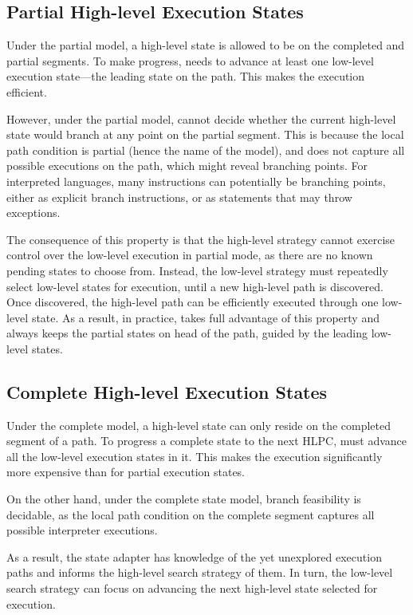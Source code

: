\subsection{Partial High-level Execution States}

Under the partial model, a high-level state is allowed to be on the completed and partial segments.
%
To make progress, \chef needs to advance at least one low-level execution state---the leading state on the path.  This makes the execution efficient.

However, under the partial model, \chef cannot decide whether the current high-level state would branch at any point on the partial segment.
%
This is because the local path condition is partial (hence the name of the model), and does not capture all possible executions on the path, which might reveal branching points.  For interpreted languages, many instructions can potentially be branching points, either as explicit branch instructions, or as statements that may throw exceptions.  

The consequence of this property is that the high-level strategy cannot exercise control over the low-level execution in partial mode, as there are no known pending states to choose from.
%
Instead, the low-level strategy must repeatedly select low-level states for execution, until a new high-level path is discovered.
%
Once discovered, the high-level path can be efficiently executed through one low-level state.
%
As a result, in practice, \chef takes full advantage of this property and always keeps the partial states on head of the path, guided by the leading low-level states.

\subsection{Complete High-level Execution States}

Under the complete model, a high-level state can only reside on the completed segment of a path.
%
To progress a complete state to the next HLPC, \chef must advance all the low-level execution states in it.  This makes the execution significantly more expensive than for partial execution states.

On the other hand, under the complete state model, branch feasibility is decidable, as the local path condition on the complete segment captures all possible interpreter executions.

As a result, the state adapter has knowledge of the yet unexplored execution paths and informs the high-level search strategy of them.
%
In turn, the low-level search strategy can focus on advancing the next high-level state selected for execution.


